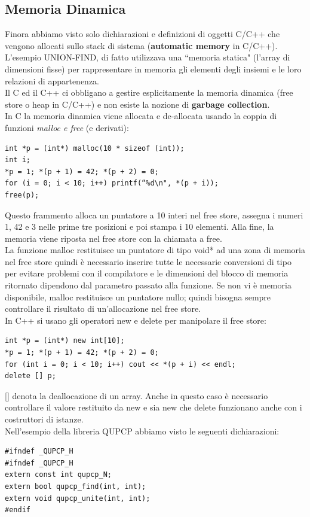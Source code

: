 \documentclass[a4paper,12pt, oneside]{book}
\begin{document}
\subsection{Memoria Dinamica}
Finora abbiamo visto solo dichiarazioni e definizioni di oggetti C/C++ che vengono allocati sullo stack di sistema (\textbf{automatic memory} in C/C++). L’esempio UNION-FIND, di fatto utilizzava una “memoria statica"
(l’array di dimensioni fisse) per rappresentare in memoria gli elementi
degli insiemi e le loro relazioni di appartenenza.\\
Il C ed il C++ ci obbligano a gestire esplicitamente la memoria dinamica
(free store o heap in C/C++) e non esiste la nozione di \textbf{garbage collection}.\\
In C la memoria dinamica viene allocata e de-allocata usando la coppia
di funzioni \textit{malloc e free }(e derivati):
\begin{verbatim}
int *p = (int*) malloc(10 * sizeof (int));
int i;
*p = 1; *(p + 1) = 42; *(p + 2) = 0;
for (i = 0; i < 10; i++) printf(“%d\n", *(p + i));
free(p);
\end{verbatim}
Questo frammento alloca un puntatore a 10 interi nel free store, assegna i numeri 1, 42 e 3 nelle prime tre posizioni e poi stampa i 10 elementi. Alla fine, la memoria viene riposta nel free store con la chiamata a free.\\
La funzione malloc restituisce un puntatore di tipo void* ad
una zona di memoria nel free store quindi è necessario inserire tutte le necessarie conversioni di tipo
per evitare problemi con il compilatore e le dimensioni del blocco di memoria ritornato dipendono dal
parametro passato alla funzione. Se non vi è memoria disponibile, malloc restituisce un puntatore
nullo; quindi bisogna sempre controllare il risultato di un’allocazione nel free store.\\
In C++ si usano gli operatori new e delete per manipolare il
free store:
\begin{verbatim}
int *p = (int*) new int[10];
*p = 1; *(p + 1) = 42; *(p + 2) = 0;
for (int i = 0; i < 10; i++) cout << *(p + i) << endl;
delete [] p;
\end{verbatim}
[] denota la deallocazione di un array. Anche in questo caso è necessario controllare il valore restituito
da new e sia new che delete funzionano anche con i costruttori di istanze.\\
Nell’esempio della libreria QUPCP abbiamo visto le seguenti
dichiarazioni:
\begin{verbatim}
#ifndef _QUPCP_H
#ifndef _QUPCP_H
extern const int qupcp_N;
extern bool qupcp_find(int, int);
extern void qupcp_unite(int, int);
#endif
\end{verbatim}
\end{document}
